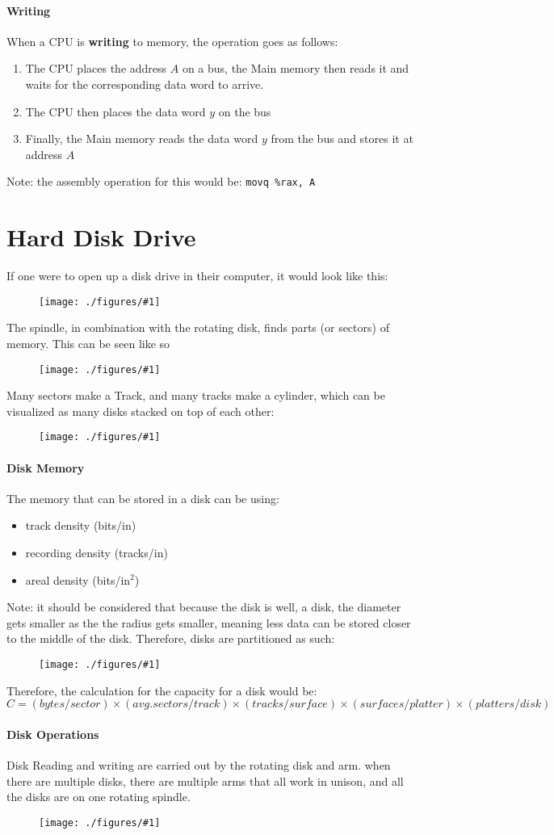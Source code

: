 \documentclass[12pt]{book}
\newcommand{\incimg}[2]{%
       \begin{figure}[h]
               \centering
               \texttt{[image: ./figures/\#1]}
       \end{figure}
}
\begin{document}
\paragraph{Writing}
When a CPU is \textbf{writing} to memory, the operation goes as follows:
\begin{enumerate}
        \item The CPU places the address $A$ on a bus, the Main memory then 
                reads it and waits for the corresponding data word to arrive.
        \item The CPU then places the data word $y$ on the bus
        \item Finally, the Main memory reads the data word $y$ from the bus and
                stores it at address $A$
\end{enumerate}
Note: the assembly operation for this would be: \texttt{movq \%rax, A}
\pagebreak

\section*{Hard Disk Drive}
If one were to open up a disk drive in their computer, it would look like this:
\incimg{disk}{0.5}
The spindle, in combination with the rotating disk, finds parts (or sectors) of
memory. This can be seen like so
\incimg{diskMem}{0.5}

Many sectors make a Track, and many tracks make a cylinder, which can be 
visualized as many disks stacked on top of each other:
\incimg{disks}{0.5}

\paragraph{Disk Memory}
The memory that can be stored in a disk can be using:
\begin{itemize}
        \item track density (bits/in)
        \item recording density (tracks/in)
        \item areal density (bits/$\text{in}^2$)
\end{itemize}

Note: it should be considered that because the disk is well, a disk, the diameter
gets smaller as the the radius gets smaller, meaning less data can be stored
closer to the middle of the disk. Therefore, disks are partitioned as 
such:
\incimg{diskPart}{0.7}

Therefore, the calculation for the capacity for a disk would be:
{\scriptsize
\[C = (bytes/sector)\times(avg.sectors/track)\times(tracks/surface)\times(surfaces/platter)\times(platters/disk)\]
}

\paragraph{Disk Operations}
Disk Reading and writing are carried out by the rotating disk and arm. when
there are multiple disks, there are multiple arms that all work in unison, and
all the disks are on one rotating spindle.

\incimg{diskOps}{0.7}
\end{document}

